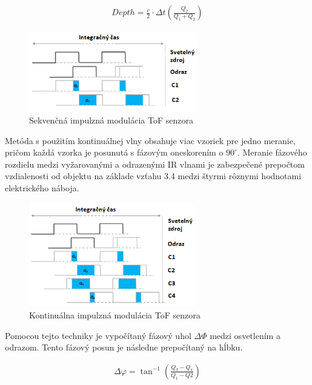 \begin{equation}
\label{eq3}
\begin{aligned}
Depth=\frac{c}{2}\cdot\Delta t \left( \frac{Q_2}{Q_1 + Q_2}\right) 
\end{aligned}
\end{equation}

\begin{figure}[H]
	\centering
	\includegraphics[width=0.65\textwidth]{figures/tof_principle_a.png} 
	\caption{Sekvenčná impulzná modulácia ToF senzora}
	\label{fig:tof_principle_a}
\end{figure}

Metóda s použitím kontinuálnej vlny obsahuje viac vzoriek pre jedno meranie, pričom každá vzorka je posunutá s fázovým oneskorením o $90^\circ$. Meranie fázového rozdielu medzi vyžarovanými a odrazenými IR vlnami je zabezpečené prepočtom vzdialenosti od objektu na základe vzťahu 3.4 medzi štyrmi rôznymi hodnotami elektrického náboja.

\begin{figure}[H]

	\centering
	\includegraphics[width=0.65\textwidth]{figures/tof_principle_b.png} 
	\caption{Kontinuálna impulzná modulácia ToF senzora}
	\label{fig:tof_principle_b}

\end{figure}

Pomocou tejto techniky je vypočítaný fázový uhol $\Delta \varPhi$ medzi osvetlením a odrazom. Tento fázový posun je následne prepočítaný na hĺbku.

\begin{equation}
\label{eq4}
\begin{aligned}
\Delta \varphi=\tan^{-1} \left( \frac{Q_3 - Q_4}{Q_1-Q2} \right) 
\end{aligned}
\end{equation}

